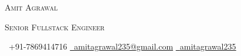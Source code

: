 {\centering
    { \Huge \scshape Amit Agrawal\par}
    { \scshape Senior Fullstack Engineer\par}
    \vspace{4pt}
    \small \raisebox{-0.1\height}\faPhone\ +91{-}7869414716
    \quad\textbar\quad \href{mailto:amitagrawal235@gmail.com}{\raisebox{-0.2\height}\faEnvelope\  \underline{amitagrawal235@gmail.com}}
    \quad\textbar\quad \href{https://linkedin.com/in/amitagrawal235/}{\raisebox{-0.2\height}\faLinkedin\ \underline{amitagrawal235}}
    \par
}

